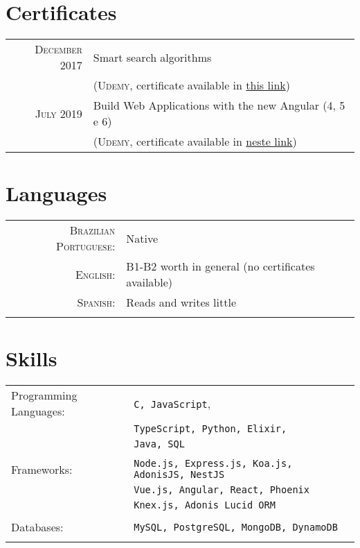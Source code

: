 \documentclass[a4paper,10pt]{article}
\begin{document}
\section{Certificates}
\begin{tabular}{rl}
\textsc{December} 2017 & Smart search algorithms\\ & (\textsc{Udemy}, \footnotesize{certificate available in \href{https://www.udemy.com/certificate/UC-9414I0UR/}{this link}})\\
\textsc{July} 2019 &  Build Web Applications with the new Angular (4, 5 e 6)\\ & (\textsc{Udemy}, \footnotesize{certificate available in \href{https://www.udemy.com/certificate/UC-P6VGWTET/}{neste link}})
\end{tabular}

\section{Languages}
\begin{tabular}{rl}
 \textsc{Brazilian Portuguese:}& Native\\
\textsc{English:}&B1-B2 worth in general (no certificates available)\\
\textsc{Spanish:}&Reads and writes little\\\\
\end{tabular}

\section{Skills}
\begin{tabular}{ll}
  Programming Languages: &\texttt{C, JavaScript},\\
                         &\texttt{TypeScript, Python, Elixir,}\\
                         &\texttt{Java, SQL}\\\\
  Frameworks: &\texttt{Node.js, Express.js, Koa.js, AdonisJS, NestJS}\\
              &\texttt{Vue.js, Angular, React, Phoenix}\\
              &\texttt{Knex.js, Adonis Lucid ORM}\\\\
  Databases: &\texttt{MySQL, PostgreSQL, MongoDB, DynamoDB}\\\\
\end{tabular}
\end{document}

